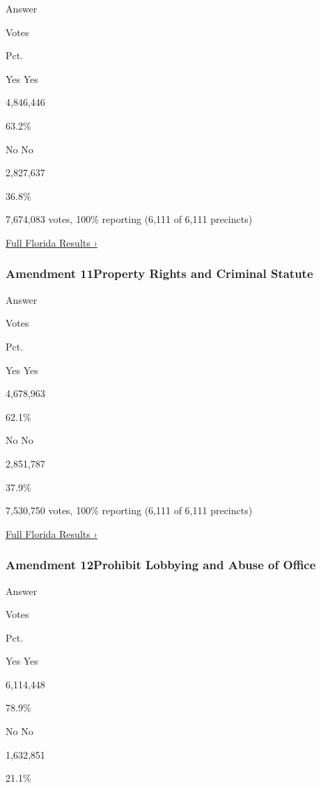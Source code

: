 Answer

Votes

Pct.

 Yes Yes

4,846,446

63.2\%

 No No

2,827,637

36.8\%

7,674,083 votes, 100\% reporting (6,111 of 6,111 precincts)

\href{https://www.nytimes3xbfgragh.onion/interactive/2018/11/06/us/elections/results-florida-elections.html}{Full
Florida Results ›}

\hypertarget{amendment-11property-rights-and-criminal-statute}{%
\subsubsection{Amendment 11Property Rights and Criminal
Statute}\label{amendment-11property-rights-and-criminal-statute}}

Answer

Votes

Pct.

 Yes Yes

4,678,963

62.1\%

 No No

2,851,787

37.9\%

7,530,750 votes, 100\% reporting (6,111 of 6,111 precincts)

\href{https://www.nytimes3xbfgragh.onion/interactive/2018/11/06/us/elections/results-florida-elections.html}{Full
Florida Results ›}

\hypertarget{amendment-12prohibit-lobbying-and-abuse-of-office}{%
\subsubsection{Amendment 12Prohibit Lobbying and Abuse of
Office}\label{amendment-12prohibit-lobbying-and-abuse-of-office}}

Answer

Votes

Pct.

 Yes Yes

6,114,448

78.9\%

 No No

1,632,851

21.1\%

